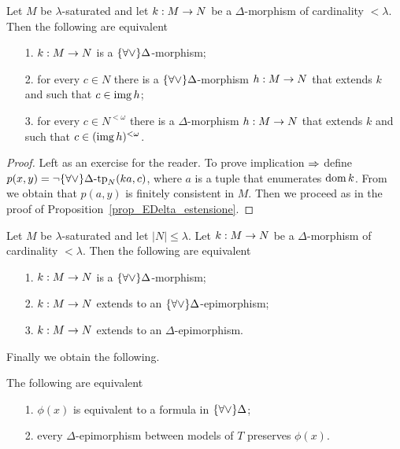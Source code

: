 \begin{proposition}\label{prop_ADelta_estensione}
Let $M$ be $\lambda$-saturated and let $k:M\rightarrow N$ be a $\Delta$-morphism of cardinality $<\lambda$. Then the following are equivalent
\begin{itemize}
\item[1.] $k:M\rightarrow N$ is a $\{\forall\vee\}\Delta$-morphism;
\item[2.] for every $c\in N$ there is a $\{\forall\vee\}\Delta$-morphism $h:M\rightarrow N$ that extends $k$ and such that $c\in\mathop{\rm img} h$;
\item[3.] for every $c\in N^{<\omega}$ there is a $\Delta$-morphism $h:M\rightarrow N$ that extends $k$ and such that $c\in(\mathop{\rm img} h)^{<\omega}$.
\end{itemize}
\end{proposition}

\begin{proof} Left as an exercise for the reader. To prove implication $\Rightarrow$ define $p(x,y)=\neg\{\forall\vee\}\Delta\mbox{-}\textrm{tp}_N (ka,c)$, where $a$ is a tuple that enumerates $\mathop{\rm dom} k$. From  we obtain that $p(a,y)$ is finitely consistent in $M$. Then we proceed as in the proof of Proposition~\ref{prop_EDelta_estensione}.
\end{proof}

\begin{corollary}\label{corol_ADelta_estensione}
Let $M$ be $\lambda$-saturated and let $|N|\le\lambda$. Let $k:M\rightarrow N$ be a $\Delta$-morphism of cardinality $<\lambda$. Then the following are equivalent
\begin{itemize}
\item[1.] $k:M\rightarrow N$ is a $\{\forall\vee\}\Delta$-morphism;
\item[2.] $k:M\rightarrow N$ extends to an $\{\forall\vee\}\Delta$-epimorphism;
\item[3.] $k:M\rightarrow N$ extends to an $\Delta$-epimorphism.\QED
\end{itemize}
\end{corollary}

Finally we obtain the following.

\begin{theorem}
The following are equivalent
\begin{itemize}
\item[1.] $\phi(x)$ is equivalent to a formula in $\{\forall\vee\}\Delta$;
\item[2.] every $\Delta$-epimorphism between models of $T$ preserves $\phi(x)$.\QED
\end{itemize}
\end{theorem}










